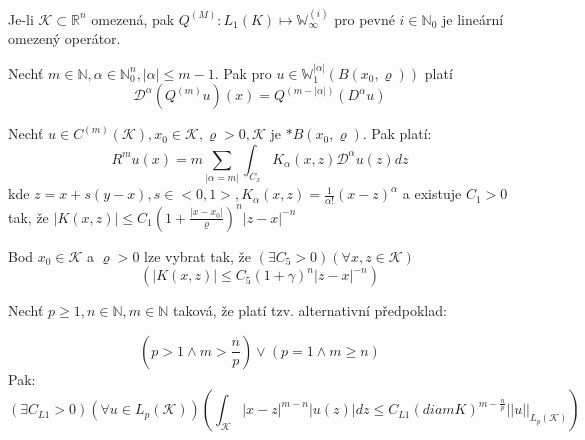 \documentclass[../main.tex]{subfiles}
\begin{document}
\begin{claim}[T3]
    Je-li $\mathcal{K} \subset \mathbb{R}^n$ omezená, pak $Q^{(M)}: L_1(K) \mapsto \mathbb{W}^{(i)}_\infty$ pro pevné $i\in\mathbb{N}_0$ je lineární omezený operátor.
\end{claim}


\begin{claim}[T4]
    Nechť $m\in\mathbb{N}, \alpha\in\mathbb{N}^n_0, |\alpha|\leq m-1$. Pak pro $u\in \mathbb{W}_1^{|\alpha|} (B(x_0, \varrho))$ platí
    \begin{equation*}
        \mathcal{D}^\alpha (Q^{(m)}u)(x) = Q^{(m-|\alpha|)} (D^\alpha u)
    \end{equation*}
\end{claim}


\begin{theorem} 
    Nechť $u\in C^{(m)}(\mathcal{K}), x_0 \in \mathcal{K}, \varrho > 0, \mathcal{K}$ je $*B(x_0,\varrho)$. Pak platí:
    \begin{equation*}
        R^m u(x) = m \sum_{|\alpha = m|} \int_{C_x} K_\alpha (x,z) \mathcal{D}^\alpha u(z)dz 
     \end{equation*}
     kde $z=x + s(y-x), s\in <0,1>, K_\alpha (x,z) = \frac{1}{\alpha!} (x-z)^\alpha$ a existuje $C_1 > 0$ tak, že $|K(x,z)| \leq C_1 (1 + \frac{|x-x_0|}{\varrho})^n |z-x|^{-n}$
\end{theorem}



\begin{claim}[T5]
    Bod $x_0 \in \mathcal{K}$ a $\varrho>0$ lze vybrat tak, že $(\exists C_5 >0) (\forall x,z \in \mathcal{K})$
    \begin{equation*}
        \left(|K(x,z)| \leq C_5 (1+\gamma)^n |z-x|^{-n} \right)
    \end{equation*}
\end{claim}


\begin{lemma}[L1]
    Nechť $p\geq 1,n \in \mathbb{N}, m\in\mathbb{N}$ taková, že platí tzv. alternativní předpoklad:
    

    \begin{equation*}
        (p>1 \wedge m>\frac{n}{p}) \vee (p = 1 \wedge m\geq n) 
    \end{equation*}
     Pak: 
    \begin{equation*}
        (\exists C_{L1} > 0) (\forall u \in L_p (\mathcal{K})) (\int_{\mathcal{K}} |x-z|^{m-n} |u(z)| dz \leq C_{L1} (diam K)^{m-\frac{n}{p}} || u ||_{L_p(\mathcal{K})})
    \end{equation*}
\end{lemma}
\end{document}
